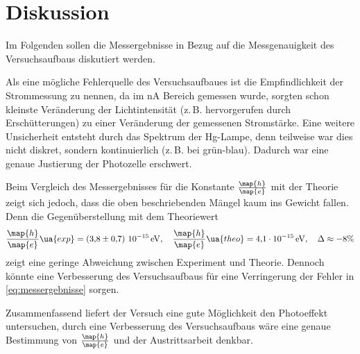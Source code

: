 \section{Diskussion}
Im Folgenden sollen die Messergebnisse in Bezug auf die Messgenauigkeit des
Versuchsaufbaus diskutiert werden. %

Als eine mögliche Fehlerquelle des Versuchsaufbaues ist die Empfindlichkeit der
Strommessung zu nennen, da im $\si{\nano\ampere}$ Bereich gemessen wurde, sorgten schon kleinste %
Veränderung der Lichtintensität (z.\,B. hervorgerufen durch Erschütterungen) zu einer Veränderung der gemessenen Stromstärke. %
Eine weitere Unsicherheit entsteht durch das Spektrum der Hg-Lampe, denn %
teilweise war dies nicht diskret, sondern kontinuierlich (z.\,B. bei grün-blau). %
Dadurch war eine genaue Justierung der Photozelle erschwert.

Beim Vergleich des Messergebnisses für die Konstante $\frac{\map{h}}{\map{e}}$ mit der Theorie
zeigt sich jedoch, dass die oben beschriebenden Mängel kaum ins Gewicht fallen.
Denn die Gegenüberstellung mit dem Theoriewert\cite{scipy} %
\begin{equation}
  \label{eq:abweichung}
  \frac{\map{h}}{\map{e}}\ua{exp}=\left(\num{3.8\pm 0.7}\right)\,\num{e-15}\,\si{\eV}, \quad  \frac{\map{h}}{\map{e}}\ua{theo}=\num{4.1 e-15}\,\si{\eV}, \quad \Delta\approx -8\%
\end{equation}
zeigt eine geringe Abweichung zwischen Experiment und Theorie. Dennoch könnte eine Verbesserung des Versuchsaufbaus
für eine Verringerung der Fehler in \eqref{eq:messergebnisse} sorgen.


Zusammenfassend liefert der Versuch eine gute Möglichkeit den Photoeffekt untersuchen, %
durch eine Verbesserung des Versuchsaufbaus wäre eine genaue Bestimmung von $\frac{\map{h}}{\map{e}}$
und der Austrittsarbeit denkbar.
